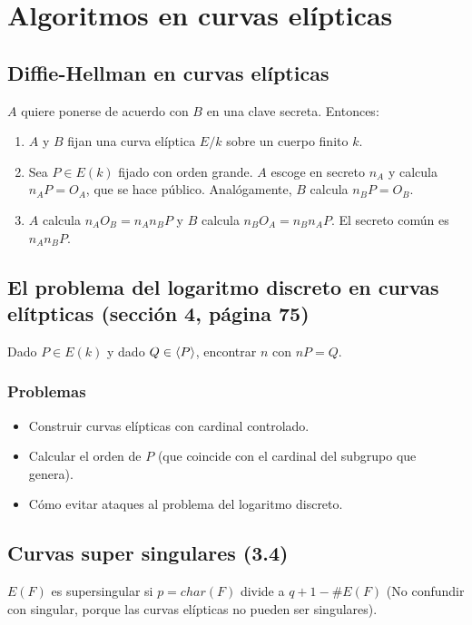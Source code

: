 \documentclass[CR.tex]{subfiles}
\begin{document}

\chapter{Algoritmos en curvas elípticas}
\section{Diffie-Hellman en curvas elípticas}
$A$ quiere ponerse de acuerdo con $B$ en una clave secreta. Entonces:
\begin{enumerate}
\item $A$ y $B$ fijan una curva elíptica $E/k$ sobre un cuerpo finito $k$. 
\item Sea $P\in E(k)$ fijado con orden grande. $A$ escoge en secreto $n_A$ y calcula $n_AP=O_A$, que se hace público. Analógamente, $B$ calcula $n_BP=O_B$. 
\item $A$ calcula $n_AO_B=n_An_BP$ y $B$ calcula $n_BO_A=n_Bn_AP$. El secreto común es $n_An_BP$. 
\end{enumerate}

\section{El problema del logaritmo discreto en curvas elítpticas (sección 4, página 75)}

Dado $P\in E(k)$ y dado $Q\in\langle{P}\rangle$, encontrar $n$ con $nP=Q$. 

\subsection{Problemas}
\begin{itemize}
\item Construir curvas elípticas con cardinal controlado.
\item Calcular el orden de $P$ (que coincide con el cardinal del subgrupo que genera).
\item Cómo evitar ataques al problema del logaritmo discreto. 
\end{itemize}

\section{Curvas super singulares (3.4)}
\begin{defi}[3.4.1]
$E(F)$ es supersingular si $p=char(F)$ divide a $q+1-\#E(F)$ (No confundir con singular, porque las curvas elípticas no pueden ser singulares). 
\end{defi}
\end{document}
